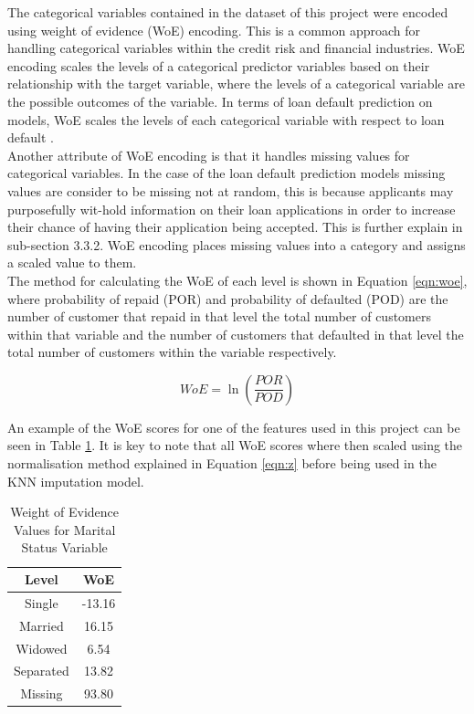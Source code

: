 The categorical variables contained in the dataset of this project were encoded using weight of evidence (WoE) encoding. This is a common approach for handling categorical variables within the credit risk and financial industries. WoE encoding scales the levels of a categorical predictor variables based on their relationship with the target variable, where the levels of a categorical variable are the possible outcomes of the variable. In terms of loan default prediction on models, WoE scales the levels of each categorical variable with respect to loan default \parencite{WOE}. \\

Another attribute of WoE encoding is that it handles missing values for categorical variables. In the case of the loan default prediction models missing values are consider to be missing not at random, this is because applicants may purposefully wit-hold information on their loan applications in order to increase their chance of having their application being accepted. This is further explain in sub-section 3.3.2. WoE encoding places missing values into a category and assigns a scaled value to them. \\

The method for calculating the WoE of each level is shown in Equation \ref{eqn:woe}, where probability of repaid (POR) and probability of defaulted (POD) are the number of customer that repaid in that level the total number of customers within that variable  and the number of customers that defaulted in that level the total number of customers within the variable respectively. 

\vspace{10pt}

\begin{equation}\label{eqn:woe}
    WoE = \ln{(\dfrac{POR}{POD})}
\end{equation}

\vspace{10pt}

An example of the WoE scores for one of the features used in this project can be seen in Table \ref{table:woe}. It is key to note that all WoE scores where then scaled using the normalisation method explained in Equation \ref{eqn:z} before being used in the KNN imputation model.  

\vspace{10pt}

\begin{table}[H]
\begin{center}
\begin{tabular}{|c|c|} 
\hline
\multicolumn{1}{|c}{Level} &\multicolumn{1}{|c|}{WoE}\\
\hline
Single & -13.16  \\
\hline
Married & 16.15  \\
\hline
Widowed & 6.54  \\
\hline
Separated & 13.82\\
\hline
Missing & 93.80\\
\hline
\end{tabular}
\end{center}
\caption{Weight of Evidence Values for Marital Status Variable}
\label{table:woe}
\end{table}



